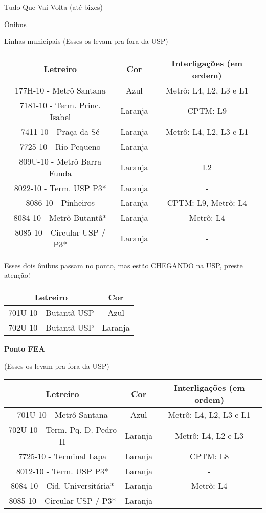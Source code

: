 \begin{secao}{Tudo Que Vai Volta (até bixes)}
\begin{subsecao}{Ônibus}
\begin{subsubsecao}{Linhas municipais}
(Esses os levam pra fora da USP)
\begin{center}
	\begin{tabular}{|c|c|c|}
      \hline
	  Letreiro & Cor & Interligações (em ordem)\\
	  \hline
	  177H-10 - Metrô Santana & Azul & Metrô: L4, L2, L3 e L1\\
	  7181-10 - Term. Princ. Isabel & Laranja & CPTM: L9\\
	  7411-10 - Praça da Sé & Laranja & Metrô: L4, L2, L3 e L1\\
	  7725-10 - Rio Pequeno & Laranja & - \\
	  809U-10 - Metrô Barra Funda & Laranja & L2 \\
	  8022-10 - Term. USP P3* & Laranja & -\\
   	8086-10 - Pinheiros & Laranja & CPTM: L9, Metrô: L4 \\
   	8084-10 - Metrô Butantã* & Laranja & Metrô: L4\\
    8085-10 - Circular USP / P3* & Laranja & -\\
      \hline
	\end{tabular}
\end{center}

Esses dois ônibus passam no ponto, mas estão CHEGANDO na USP, preste 
atenção!

\begin{center}
	\begin{tabular}{|c|c|}
	  \hline
	  Letreiro & Cor\\
	  \hline
	  701U-10 - Butantã-USP & Azul\\
	  702U-10 - Butantã-USP & Laranja\\
	  \hline
	\end{tabular}
\end{center}

{\bf Ponto FEA}

(Esses os levam pra fora da USP)
\begin{center}
	\begin{tabular}{|c|c|c|}
      \hline
	  Letreiro & Cor & Interligações (em ordem)\\
	  \hline
	  701U-10 - Metrô Santana & Azul & Metrô: L4, L2, L3 e L1\\
	  702U-10 - Term. Pq. D. Pedro II & Laranja & Metrô: L4, L2 e L3\\
	  7725-10 - Terminal Lapa & Laranja & CPTM: L8\\
	  8012-10 - Term. USP P3* & Laranja & -\\
	  8084-10 - Cid. Universitária* & Laranja & Metrô: L4\\
    8085-10 - Circular USP / P3* & Laranja & -\\


\end{tabular}
\end{center}
\end{subsubsecao}
\end{subsecao}
\end{secao}
